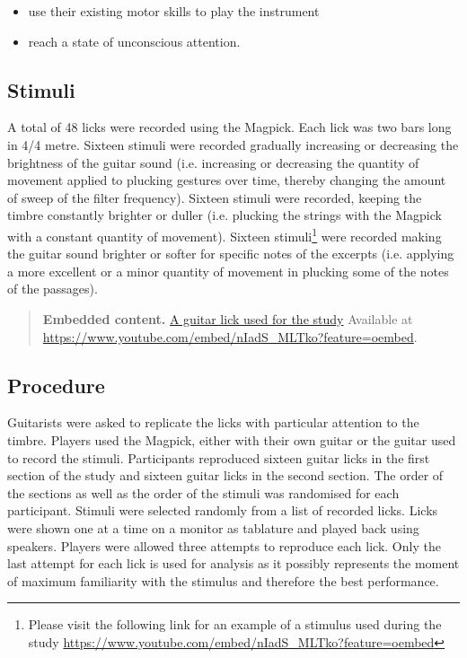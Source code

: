 \documentclass[sigconf]{nimeart}
\begin{document}
\begin{itemize}
\item
  use their existing motor skills to play the instrument
\item
  reach a state of unconscious attention.
\end{itemize}

\subsection{Stimuli}\label{stimuli}

A total of 48 licks were recorded using the Magpick. Each lick was two bars long in 4/4 metre. Sixteen stimuli were recorded gradually increasing or decreasing the brightness of the guitar sound (i.e. increasing or decreasing the quantity of movement applied to plucking gestures over time, thereby changing the amount of sweep of the filter frequency). Sixteen stimuli were recorded, keeping the timbre constantly brighter or duller (i.e. plucking the strings with the Magpick with a constant quantity of movement). Sixteen stimuli\footnote{Please visit the following link for an example of a stimulus used during the study \url{https://www.youtube.com/embed/nIadS_MLTko?feature=oembed}} were recorded making the guitar sound brighter or softer for specific notes of the excerpts (i.e. applying a more excellent or a minor quantity of movement in plucking some of the notes of the passages).


\begin{quote}\small\textbf{Embedded content.} \href{https://www.youtube.com/embed/nIadS_MLTko?feature=oembed}{A guitar lick used for the study} Available at \url{https://www.youtube.com/embed/nIadS_MLTko?feature=oembed}.\end{quote}


\subsection{Procedure}\label{procedure}

Guitarists were asked to replicate the licks with particular attention to the timbre. Players used the Magpick, either with their own guitar or the guitar used to record the stimuli. Participants reproduced sixteen guitar licks in the first section of the study and sixteen guitar licks in the second section. The order of the sections as well as the order of the stimuli was randomised for each participant. Stimuli were selected randomly from a list of recorded licks. Licks were shown one at a time on a monitor as tablature and played back using speakers. Players were allowed three attempts to reproduce each lick. Only the last attempt for each lick is used for analysis as it possibly represents the moment of maximum familiarity with the stimulus and therefore the best performance.
\end{document}
